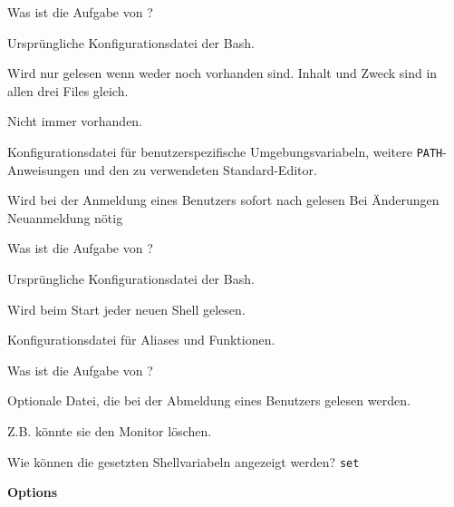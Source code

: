 \begin{flashcard}[File]{Was ist die Aufgabe von ?}
	\begin{description}
		\item Ursprüngliche Konfigurationsdatei der Bash.
		
		\item Wird nur gelesen wenn weder  noch  vorhanden sind. Inhalt und Zweck sind in allen drei Files gleich.
		
		\item Nicht immer vorhanden.
		
		\item Konfigurationsdatei für benutzerspezifische Umgebungsvariabeln, weitere \texttt{PATH}-Anweisungen und den zu verwendeten Standard-Editor.
		
		\item Wird bei der Anmeldung eines Benutzers sofort nach  gelesen \textrightarrow Bei Änderungen Neuanmeldung nötig 
	\end{description}
\end{flashcard}

\begin{flashcard}[File]{Was ist die Aufgabe von ?}
	\begin{description}
		\item Ursprüngliche Konfigurationsdatei der Bash.
		
		\item Wird beim Start jeder neuen Shell gelesen.
		
		\item Konfigurationsdatei für Aliases und Funktionen.
	\end{description}
\end{flashcard}

\begin{flashcard}[File]{Was ist die Aufgabe von ?}
	\begin{description}
		\item Optionale Datei, die bei der Abmeldung eines Benutzers gelesen werden.
		
		\item Z.B. könnte sie den Monitor löschen.
	\end{description}
\end{flashcard}

\begin{flashcard}[Command]{Wie können die gesetzten Shellvariabeln angezeigt werden?}
	\texttt{set}
	
	\begin{description}
		\item \textbf{Options}
		
		\begin{description}
			\item \todo{options here}
		\end{description}
	\end{description}
	
	
\end{flashcard}

